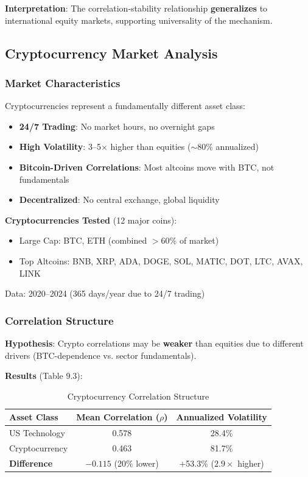 \textbf{Interpretation}: The correlation-stability relationship \textbf{generalizes} to international equity markets, supporting universality of the mechanism.

\subsection{Cryptocurrency Market Analysis}

\subsubsection{Market Characteristics}

Cryptocurrencies represent a fundamentally different asset class:

\begin{itemize}
\item \textbf{24/7 Trading}: No market hours, no overnight gaps
\item \textbf{High Volatility}: 3--5$\times$ higher than equities ($\sim$80\% annualized)
\item \textbf{Bitcoin-Driven Correlations}: Most altcoins move with BTC, not fundamentals
\item \textbf{Decentralized}: No central exchange, global liquidity
\end{itemize}

\textbf{Cryptocurrencies Tested} (12 major coins):
\begin{itemize}
\item Large Cap: BTC, ETH (combined $>$60\% of market)
\item Top Altcoins: BNB, XRP, ADA, DOGE, SOL, MATIC, DOT, LTC, AVAX, LINK
\end{itemize}

Data: 2020--2024 (365 days/year due to 24/7 trading)

\subsubsection{Correlation Structure}

\textbf{Hypothesis}: Crypto correlations may be \textbf{weaker} than equities due to different drivers (BTC-dependence vs. sector fundamentals).

\textbf{Results} (Table 9.3):

\begin{table}[H]
\centering
\caption{Cryptocurrency Correlation Structure}
\label{tab:crypto-correlations}
\begin{tabular}{@{}lcc@{}}
\toprule
\textbf{Asset Class} & \textbf{Mean Correlation ($\rho$)} & \textbf{Annualized Volatility} \\
\midrule
US Technology & 0.578 & 28.4\% \\
Cryptocurrency & 0.463 & 81.7\% \\
\textbf{Difference} & $-0.115$ (20\% lower) & +53.3\% ($2.9\times$ higher) \\
\bottomrule
\end{tabular}
\end{table}

